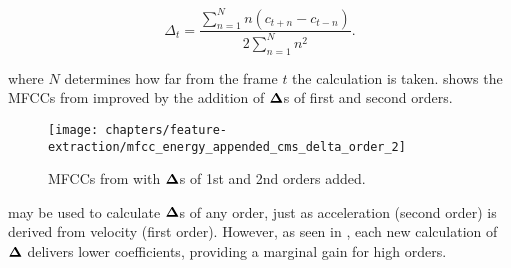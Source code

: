 \begin{equation}
    \Delta_t = \frac{\sum_{n=1}^N n(c_{t+n} - c_{t-n})}{2\sum_{n=1}^N n^2}.
    \label{eq:deltas}
\end{equation}

\noindent where $N$ determines how far from the frame $t$ the calculation is taken.  shows the MFCCs from  improved by the addition of $\boldsymbol{\Delta}$s of first and second orders.

\begin{figure}[ht]
    \centering
    \texttt{[image: chapters/feature-extraction/mfcc\_energy\_appended\_cms\_delta\_order\_2]}
    \caption{MFCCs from  with $\boldsymbol{\Delta}$s of 1st and 2nd orders added.}
    \label{fig:mfcc_energy_appended_cms_delta_order_2}
\end{figure}

 may be used to calculate $\boldsymbol{\Delta}$s of any order, just as acceleration (second order) is derived from velocity (first order). However, as seen in , each new calculation of $\boldsymbol{\Delta}$ delivers lower coefficients, providing a marginal gain for high orders.